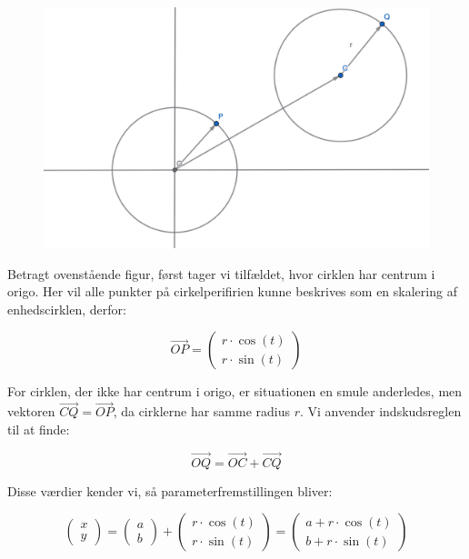 \begin{proofw}
    \begin{figure}[h]
        \centering
        \includegraphics[scale=0.3]{skitser/cirkel.png}
    \end{figure}

    Betragt ovenstående figur, først tager vi tilfældet,
    hvor cirklen har centrum i origo. Her vil alle punkter
    på cirkelperifirien kunne beskrives som en skalering af enhedscirklen, derfor:

    $$
        \vec{OP}=\begin{pmatrix}
            r\cdot \cos(t)
            \\
            r\cdot \sin(t)
        \end{pmatrix}
    $$
    
    For cirklen, der ikke har centrum i origo, er situationen en smule anderledes,
    men vektoren $\vec{CQ}=\vec{OP}$, da cirklerne har samme radius $r$.
    Vi anvender indskudsreglen til at finde:

    $$
        \vec{OQ}=\vec{OC}+\vec{CQ}
    $$

    Disse værdier kender vi, så parameterfremstillingen bliver:

    $$
    \begin{pmatrix}
        x \\ y
    \end{pmatrix}
    =\begin{pmatrix}
        a \\ b
    \end{pmatrix}
    +
    \begin{pmatrix}
        r \cdot \cos(t)
        \\
        r \cdot \sin(t)
    \end{pmatrix}
    =\begin{pmatrix}
        a+ r \cdot \cos(t)
        \\
        b+ r \cdot \sin(t)
    \end{pmatrix}
    $$

\end{proofw}
